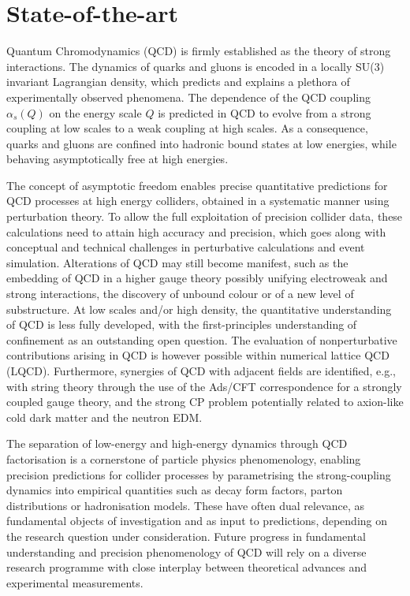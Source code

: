 
\section{State-of-the-art}
Quantum Chromodynamics (QCD) is firmly established as the theory of strong interactions. The dynamics of quarks and gluons is encoded in %
a locally SU(3) invariant Lagrangian density, which predicts and explains a plethora of experimentally observed phenomena. The dependence of the QCD coupling $\alpha_s(Q)$ on the energy scale $Q$ is predicted in QCD to evolve from a strong coupling at low scales to a weak coupling at high scales. As a consequence, quarks and gluons are confined into hadronic bound states at low energies, while behaving asymptotically free at high energies. 

The concept of asymptotic freedom enables precise quantitative predictions for QCD processes at high energy colliders, obtained in a systematic manner using perturbation theory. To allow the full exploitation of precision collider data, these calculations need to attain high accuracy and precision, which goes along with conceptual and technical challenges in perturbative calculations and event simulation. Alterations of QCD may still become manifest, such as the embedding of QCD in a higher gauge theory possibly unifying electroweak and strong interactions, the discovery of unbound colour or of a new level of substructure. At low scales and/or high density, the quantitative understanding of QCD is less fully developed, with the first-principles understanding of confinement as an outstanding open question. The  evaluation of  nonperturbative contributions arising
in QCD  is however   possible     within numerical lattice QCD (LQCD). Furthermore,  synergies of QCD with adjacent fields are identified, e.g., with string theory through the use of the Ads/CFT correspondence for a strongly coupled gauge theory,
and the strong CP problem potentially related to axion-like cold dark matter and the neutron EDM.

The separation of low-energy and high-energy dynamics through QCD factorisation is a cornerstone of particle physics phenomenology, enabling precision predictions for collider processes by parametrising the strong-coupling dynamics into empirical quantities such as decay form factors, parton distributions or hadronisation models. These have often dual relevance, as fundamental objects of investigation and as input to predictions, depending on the research question under consideration. Future progress in fundamental understanding and precision phenomenology of QCD will rely on a diverse research programme with close interplay between theoretical advances and experimental measurements. 
\vfill

